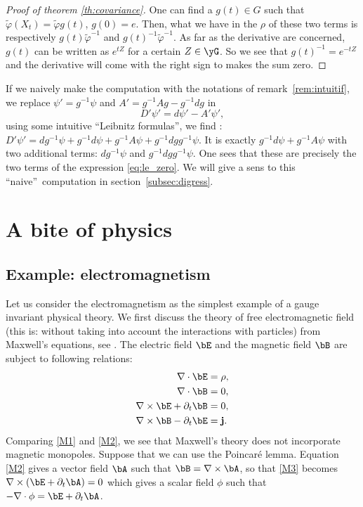 \begin{proof}[Proof of theorem \ref{th:covariance}]
One can find a $g(t)\in G$ such that $\tilde{\varphi}(X_t)=\tilde{\varphi} g(t)$, $g(0)=e$. Then, what we have in the $\rho$ of these two terms is respectively $g(t)\tilde{\varphi}^{-1}$ and $g(t)^{-1}\tilde{\varphi}^{-1}$. As far as the derivative are concerned, $g(t)$ can be written as $e^{tZ}$ for a certain $Z\in\yG$. So we see that $g(t)^{-1}=e^{-tZ}$ and the derivative will come with the right sign to makes the sum zero.
\end{proof}

\begin{remark}
If we naively make the computation with the notations of remark~\ref{rem:intuitif}, we replace $\psi'=g^{-1}\psi$ and $A'=g^{-1} Ag-g^{-1} dg$ in
\[
  D'\psi'=d\psi'-A'\psi',
\]
using some intuitive ``Leibnitz formulas'', we find :
$D'\psi'=dg^{-1}\psi+g^{-1} d\psi+g^{-1} A\psi+g^{-1} dg g^{-1}\psi$. It is exactly $g^{-1} d\psi+g^{-1} A\psi$ with two additional terms: $dg^{-1}\psi$ and $g^{-1} dg g^{-1}\psi$. One sees that these are precisely the two terms of the expression \eqref{eq:le_zero}. We will give a sens to this ``naive''\ computation in section~\ref{subsec:digress}.
\end{remark}
\section{A bite of physics}

\subsection{Example: electromagnetism}

Let us consider the electromagnetism as the simplest example of a gauge invariant physical theory. We first discuss the theory of free electromagnetic field (this is: without taking into account the interactions with particles) from Maxwell's equations, see \cite{Schomblond_em,llf}. The electric field $\bE$ and the magnetic field $\bB$ are subject to following relations:
\begin{subequations}
\begin{align}
\nabla\cdot{\bE}&=\rho,    \label{M1}\\
\nabla\cdot{\bB}&=0,                     \label{M2}  \\
\nabla\times{\bE}+\partial_t{\bB}&=0,         \label{M3}\\
\nabla\times{\bB}-\partial_t{\bE}&={\mathbf{j}}. \label{M4}
\end{align}
\end{subequations}
Comparing \eqref{M1} and \eqref{M2}, we see that Maxwell's theory does not incorporate magnetic monopoles.
Suppose that we can use the Poincaré lemma. Equation \eqref{M2} gives a vector field $\bA$ such that $\bB=\nabla\times\bA$, so that \eqref{M3} becomes $\nabla\times(\bE+\partial_t\bA)=0$ which gives a scalar field $\phi$ such that $-\nabla\cdot\phi=\bE+\partial_t\bA$.

